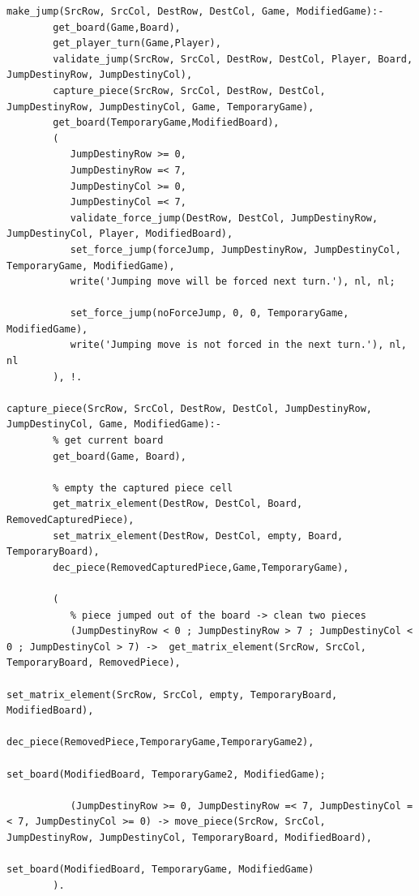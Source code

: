 \documentclass[a4paper]{article}
\begin{document}
\begin{lstlisting}[style=customprologwithlines]
make_jump(SrcRow, SrcCol, DestRow, DestCol, Game, ModifiedGame):- 
        get_board(Game,Board), 
        get_player_turn(Game,Player),
        validate_jump(SrcRow, SrcCol, DestRow, DestCol, Player, Board, JumpDestinyRow, JumpDestinyCol),
        capture_piece(SrcRow, SrcCol, DestRow, DestCol, JumpDestinyRow, JumpDestinyCol, Game, TemporaryGame),
        get_board(TemporaryGame,ModifiedBoard), 
        (
           JumpDestinyRow >= 0,
           JumpDestinyRow =< 7,
           JumpDestinyCol >= 0,
           JumpDestinyCol =< 7,
           validate_force_jump(DestRow, DestCol, JumpDestinyRow, JumpDestinyCol, Player, ModifiedBoard),
           set_force_jump(forceJump, JumpDestinyRow, JumpDestinyCol, TemporaryGame, ModifiedGame),
           write('Jumping move will be forced next turn.'), nl, nl;

           set_force_jump(noForceJump, 0, 0, TemporaryGame, ModifiedGame),
           write('Jumping move is not forced in the next turn.'), nl, nl
        ), !.

capture_piece(SrcRow, SrcCol, DestRow, DestCol, JumpDestinyRow, JumpDestinyCol, Game, ModifiedGame):-
        % get current board
        get_board(Game, Board),

        % empty the captured piece cell
        get_matrix_element(DestRow, DestCol, Board, RemovedCapturedPiece),
        set_matrix_element(DestRow, DestCol, empty, Board, TemporaryBoard),
        dec_piece(RemovedCapturedPiece,Game,TemporaryGame),

        (
           % piece jumped out of the board -> clean two pieces 
           (JumpDestinyRow < 0 ; JumpDestinyRow > 7 ; JumpDestinyCol < 0 ; JumpDestinyCol > 7) ->  get_matrix_element(SrcRow, SrcCol, TemporaryBoard, RemovedPiece),
                                                                                                   set_matrix_element(SrcRow, SrcCol, empty, TemporaryBoard, ModifiedBoard),
                                                                                                   dec_piece(RemovedPiece,TemporaryGame,TemporaryGame2),
                                                                                                   set_board(ModifiedBoard, TemporaryGame2, ModifiedGame);

           (JumpDestinyRow >= 0, JumpDestinyRow =< 7, JumpDestinyCol =< 7, JumpDestinyCol >= 0) -> move_piece(SrcRow, SrcCol, JumpDestinyRow, JumpDestinyCol, TemporaryBoard, ModifiedBoard),
                                                                                                   set_board(ModifiedBoard, TemporaryGame, ModifiedGame)
        ).




\end{lstlisting}
\end{document}
